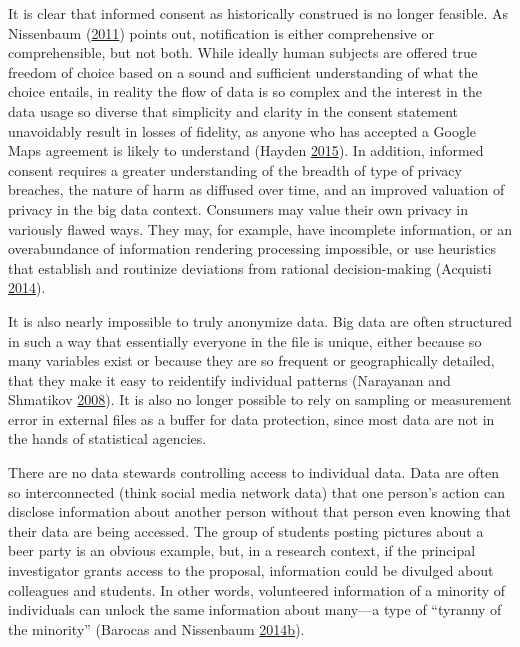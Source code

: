\documentclass[]{krantz}
\begin{document}
It is clear that informed consent as historically construed is no longer
feasible. As Nissenbaum
(\protect\hyperlink{ref-nissenbaum2011contextual}{2011}) points out,
notification is either comprehensive or comprehensible, but not both.
While ideally human subjects are offered true freedom of choice based on
a sound and sufficient understanding of what the choice entails, in
reality the flow of data is so complex and the interest in the data
usage so diverse that simplicity and clarity in the consent statement
unavoidably result in losses of fidelity, as anyone who has accepted a
Google Maps agreement is likely to understand (Hayden
\protect\hyperlink{ref-check2015researchers}{2015}). In addition,
informed consent requires a greater understanding of the breadth of type
of privacy breaches, the nature of harm as diffused over time, and an
improved valuation of privacy in the big data context. Consumers may
value their own privacy in variously flawed ways. They may, for example,
have incomplete information, or an overabundance of information
rendering processing impossible, or use heuristics that establish and
routinize deviations from rational decision-making (Acquisti
\protect\hyperlink{ref-Acquisti2014}{2014}).

It is also nearly impossible to truly anonymize data. Big data are often
structured in such a way that essentially everyone in the file is
unique, either because so many variables exist or because they are so
frequent or geographically detailed, that they make it easy to
reidentify individual patterns (Narayanan and Shmatikov
\protect\hyperlink{ref-narayanan2008robust}{2008}). It is also no longer
possible to rely on sampling or measurement error in external files as a
buffer for data protection, since most data are not in the hands of
statistical agencies.

There are no data stewards controlling access to individual data. Data
are often so interconnected (think social media network data) that one
person's action can disclose information about another person without
that person even knowing that their data are being accessed. The group
of students posting pictures about a beer party is an obvious example,
but, in a research context, if the principal investigator grants access
to the proposal, information could be divulged about colleagues and
students. In other words, volunteered information of a minority of
individuals can unlock the same information about many---a type of
``tyranny of the minority'' (Barocas and Nissenbaum
\protect\hyperlink{ref-barocas2014bigger}{2014}\protect\hyperlink{ref-barocas2014bigger}{b}).
\end{document}

